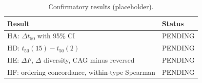 \begin{table}[t]
\centering\small
\caption{Confirmatory results (placeholder).}
\label{tab:results-pending}
\begin{tabular}{ll}
\toprule
Result & Status \\
\midrule
HA: $\Delta t_{50}$ with 95\% CI & PENDING \\
HD: $t_{50}(15)-t_{50}(2)$ & PENDING \\
HE: $\Delta F$, $\Delta$ diversity, CAG minus reversed & PENDING \\
HF: ordering concordance, within-type Spearman & PENDING \\
\bottomrule
\end{tabular}
\end{table}
